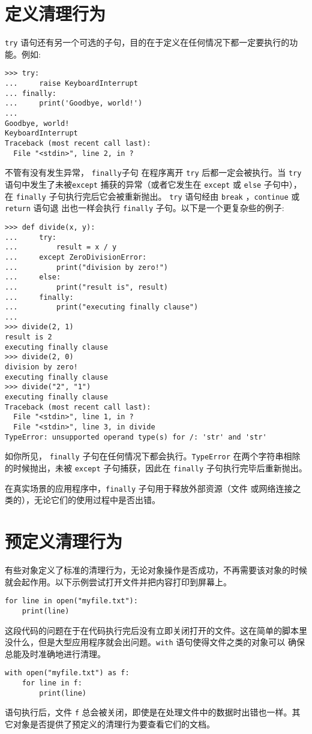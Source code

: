 \section{定义清理行为}
\texttt{try} 语句还有另一个可选的子句，目的在于定义在任何情况下都一定要执行的功能。例如:
\begin{lstlisting}
>>> try:
...     raise KeyboardInterrupt
... finally:
...     print('Goodbye, world!')
...
Goodbye, world!
KeyboardInterrupt
Traceback (most recent call last):
  File "<stdin>", line 2, in ?
\end{lstlisting}
不管有没有发生异常， \texttt{finally}子句 在程序离开  \texttt{try} 后都一定会被执行。当  \texttt{try} 语句中发生了未被\texttt{except} 捕获的异常（或者它发生在 \texttt{except} 或 \texttt{else} 子句中），在 \texttt{finally} 子句执行完后它会被重新抛出。 \texttt{try} 语句经由 \texttt{break} ，\texttt{continue} 或 \texttt{return} 语句退 出也一样会执行 \texttt{finally} 子句。以下是一个更复杂些的例子:
\begin{lstlisting}
>>> def divide(x, y):
...     try:
...         result = x / y
...     except ZeroDivisionError:
...         print("division by zero!")
...     else:
...         print("result is", result)
...     finally:
...         print("executing finally clause")
...
>>> divide(2, 1)
result is 2
executing finally clause
>>> divide(2, 0)
division by zero!
executing finally clause
>>> divide("2", "1")
executing finally clause
Traceback (most recent call last):
  File "<stdin>", line 1, in ?
  File "<stdin>", line 3, in divide
TypeError: unsupported operand type(s) for /: 'str' and 'str'
\end{lstlisting}
如你所见， \texttt{finally} 子句在任何情况下都会执行。\texttt{TypeError} 在两个字符串相除的时候抛出，未被 \texttt{except} 子句捕获，因此在 \texttt{finally} 子句执行完毕后重新抛出。

在真实场景的应用程序中，\texttt{finally} 子句用于释放外部资源（文件 或网络连接之类的），无论它们的使用过程中是否出错。
\section{预定义清理行为}
有些对象定义了标准的清理行为，无论对象操作是否成功，不再需要该对象的时候就会起作用。以下示例尝试打开文件并把内容打印到屏幕上。
\begin{lstlisting}
for line in open("myfile.txt"):
    print(line)
\end{lstlisting}
这段代码的问题在于在代码执行完后没有立即关闭打开的文件。这在简单的脚本里没什么，但是大型应用程序就会出问题。\texttt{with} 语句使得文件之类的对象可以 确保总能及时准确地进行清理。
\begin{lstlisting}
with open("myfile.txt") as f:
    for line in f:
        print(line)
\end{lstlisting}
语句执行后，文件 \texttt{f} 总会被关闭，即使是在处理文件中的数据时出错也一样。其它对象是否提供了预定义的清理行为要查看它们的文档。